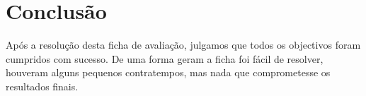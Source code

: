 \documentclass[a4paper,11pt,openright,openbib]{article}
\begin{document}


\section{Conclusão}
Após a resolução desta ficha de avaliação, julgamos que todos os objectivos foram cumpridos com sucesso. De uma forma geram a ficha foi fácil de resolver, houveram alguns pequenos contratempos, mas nada que comprometesse os resultados finais. 
\end{document}
